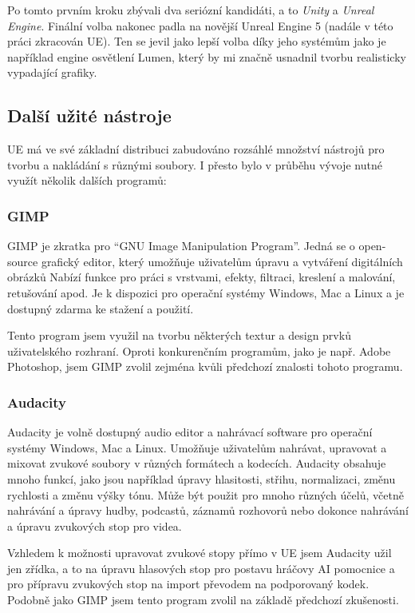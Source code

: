 \documentclass[12pt,a4paper,hidelinks]{article}
\begin{document}
Po tomto prvním kroku zbývali dva seriózní kandidáti, a to \textit{Unity} a \textit{Unreal Engine}. Finální volba nakonec padla na novější Unreal Engine 5 (nadále v této práci zkracován UE). Ten se jevil jako lepší volba díky jeho systémům jako je například engine osvětlení Lumen, který by mi značně usnadnil tvorbu realisticky vypadající grafiky.

\subsection{Další užité nástroje}
UE má ve své základní distribuci zabudováno rozsáhlé množství nástrojů pro tvorbu a nakládání s různými soubory. I přesto bylo v průběhu vývoje nutné využít několik dalších programů:

\subsubsection{GIMP}
GIMP je zkratka pro \enquote{GNU Image Manipulation Program}. Jedná se o open-source grafický editor, který umožňuje uživatelům úpravu a vytváření digitálních obrázků Nabízí funkce pro práci s vrstvami, efekty, filtraci, kreslení a malování, retušování apod. Je k dispozici pro operační systémy Windows, Mac a Linux a je dostupný zdarma ke stažení a použití.

Tento program jsem využil na tvorbu některých textur a design prvků uživatelského rozhraní. Oproti konkurenčním programům, jako je např. Adobe Photoshop, jsem GIMP zvolil zejména kvůli předchozí znalosti tohoto programu.

\subsubsection{Audacity}
Audacity je volně dostupný audio editor a nahrávací software pro operační systémy Windows, Mac a Linux. Umožňuje uživatelům nahrávat, upravovat a mixovat zvukové soubory v různých formátech a kodecích. Audacity obsahuje mnoho funkcí, jako jsou například úpravy hlasitosti, střihu, normalizaci, změnu rychlosti a změnu výšky tónu. Může být použit pro mnoho různých účelů, včetně nahrávání a úpravy hudby, podcastů, záznamů rozhovorů nebo dokonce nahrávání a úpravu zvukových stop pro videa.

Vzhledem k možnosti upravovat zvukové stopy přímo v UE jsem Audacity užil jen zřídka, a to na úpravu hlasových stop pro postavu hráčovy AI pomocnice a pro přípravu zvukových stop na import převodem na podporovaný kodek. Podobně jako GIMP jsem tento program zvolil na základě předchozí zkušenosti.
\end{document}
